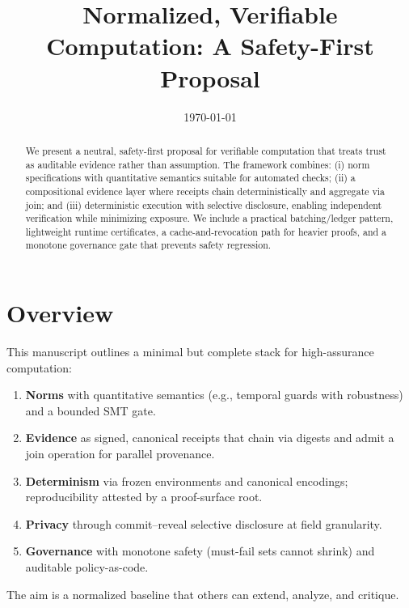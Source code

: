 \documentclass[11pt,a4paper]{article}
\title{Normalized, Verifiable Computation: A Safety-First Proposal}
\author{}
\date{\today}
\numberwithin{equation}{section}
\theoremstyle{plain}
\theoremstyle{definition}
\theoremstyle{remark}
\begin{document}
\maketitle

\begin{abstract}
We present a neutral, safety-first proposal for verifiable computation that treats trust as auditable evidence rather than assumption. The framework combines: (i) norm specifications with quantitative semantics suitable for automated checks; (ii) a compositional evidence layer where receipts chain deterministically and aggregate via join; and (iii) deterministic execution with selective disclosure, enabling independent verification while minimizing exposure. We include a practical batching/ledger pattern, lightweight runtime certificates, a cache-and-revocation path for heavier proofs, and a monotone governance gate that prevents safety regression.
\end{abstract}

\section{Overview}
This manuscript outlines a minimal but complete stack for high-assurance computation:
\begin{enumerate}[label=\textbf{O\arabic*}.]
  \item \textbf{Norms} with quantitative semantics (e.g., temporal guards with robustness) and a bounded SMT gate.
  \item \textbf{Evidence} as signed, canonical receipts that chain via digests and admit a join operation for parallel provenance.
  \item \textbf{Determinism} via frozen environments and canonical encodings; reproducibility attested by a proof-surface root.
  \item \textbf{Privacy} through commit–reveal selective disclosure at field granularity.
  \item \textbf{Governance} with monotone safety (must-fail sets cannot shrink) and auditable policy-as-code.
\end{enumerate}
The aim is a normalized baseline that others can extend, analyze, and critique.
\end{document}
